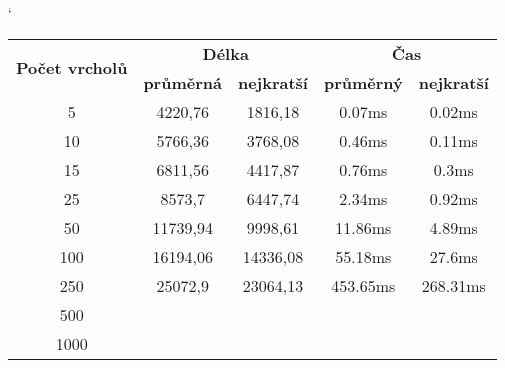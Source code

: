 \documentclass[
  printversion=false,
  joinlists=true,
  glossaries=true,
  figures=true,
  tables=true,
  sourcecodes=false,
  theorems=false,
  bibencoding=utf8,
  language=czech,
  encoding=utf8,
  program=infpvs,
  index=true,
  biblatex=true
]{kidiplom}
\begin{document}
\begin{table}[H]
\catcode`
\centering
\begin{tabular}{|c|c|c|c|c|}
\hline
\multirow{2}{*}{\textbf{Počet vrcholů}} & \multicolumn{2}{c|}{\textbf{Délka}}                                              & \multicolumn{2}{c|}{\textbf{Čas}} \\ \cline{2-5}
& \textbf{průměrná} & \textbf{nejkratší} & \textbf{průměrný} & \textbf{nejkratší} \\
\hline
5                      & 4220,76                                      & 1816,18                                       & 0.07ms                                     & 0.02ms                                      \\
10                     & 5766,36                                      & 3768,08                                       & 0.46ms                                     & 0.11ms                                      \\
15                     & 6811,56                                      & 4417,87                                       & 0.76ms                                     & 0.3ms                                       \\
25                     & 8573,7                                       & 6447,74                                       & 2.34ms                                     & 0.92ms                                      \\
50                     & 11739,94                                     & 9998,61                                       & 11.86ms                                    & 4.89ms                                      \\
100                    & 16194,06                                     & 14336,08                                      & 55.18ms                                    & 27.6ms                                      \\
250                    & 25072,9                                      & 23064,13                                      & 453.65ms                                   & 268.31ms                                    \\
500                    &                                              &                                               &                                            &                                             \\
1000                   & \multicolumn{1}{c|}{}                        & \multicolumn{1}{c|}{}                         & \multicolumn{1}{c|}{}                      & \multicolumn{1}{c|}{}                       \\

\end{tabular}
\end{table}
\end{document}
